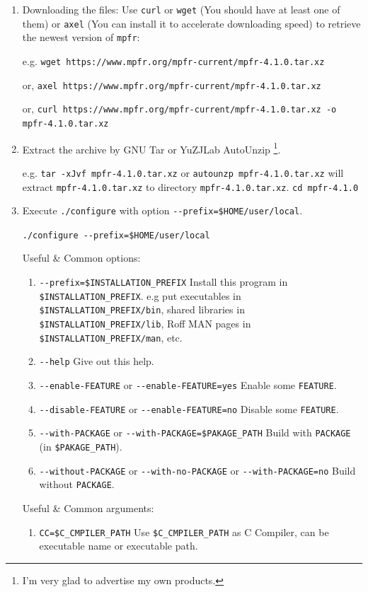 \documentclass[]{article}
\begin{document}
\begin{enumerate}
\item Downloading the files: Use \verb|curl| or \verb|wget| (You should have at least one of them) or \verb|axel| (You can install it to accelerate downloading speed) to retrieve the newest version of \verb|mpfr|:

e.g. \verb|wget https://www.mpfr.org/mpfr-current/mpfr-4.1.0.tar.xz|

or, \verb|axel https://www.mpfr.org/mpfr-current/mpfr-4.1.0.tar.xz|

or, \verb|curl https://www.mpfr.org/mpfr-current/mpfr-4.1.0.tar.xz -o mpfr-4.1.0.tar.xz|

\item Extract the archive by GNU Tar or YuZJLab AutoUnzip \footnote{I'm very glad to advertise my own products.}.

e.g. \verb|tar -xJvf mpfr-4.1.0.tar.xz| or \verb|autounzp mpfr-4.1.0.tar.xz| will extract \verb|mpfr-4.1.0.tar.xz| to directory \verb|mpfr-4.1.0.tar.xz|. \verb|cd mpfr-4.1.0|

\item Execute \verb|./configure| with option \verb|--prefix=$HOME/user/local|.

\verb|./configure --prefix=$HOME/user/local|

Useful \& Common options:
\begin{enumerate}
\item \verb|--prefix=$INSTALLATION_PREFIX| Install this program in \verb|$INSTALLATION_PREFIX|. e.g put executables in \verb|$INSTALLATION_PREFIX/bin|, shared libraries in \verb|$INSTALLATION_PREFIX/lib|, Roff MAN pages in \verb|$INSTALLATION_PREFIX/man|, etc.
\item \verb|--help| Give out this help.
\item \verb|--enable-FEATURE| or \verb|--enable-FEATURE=yes| Enable some \verb|FEATURE|.
\item \verb|--disable-FEATURE| or \verb|--enable-FEATURE=no| Disable some \verb|FEATURE|.
\item \verb|--with-PACKAGE| or \verb|--with-PACKAGE=$PAKAGE_PATH| Build with \verb|PACKAGE| (in \verb|$PAKAGE_PATH|).
\item \verb|--without-PACKAGE| or \verb|--with-no-PACKAGE| or \verb|--with-PACKAGE=no| Build without \verb|PACKAGE|.
\end{enumerate}
Useful \& Common arguments:
\begin{enumerate}
\item \verb|CC=$C_CMPILER_PATH| Use \verb|$C_CMPILER_PATH| as C Compiler, can be executable name or executable path.


\end{enumerate}
\end{enumerate}
\end{document}

